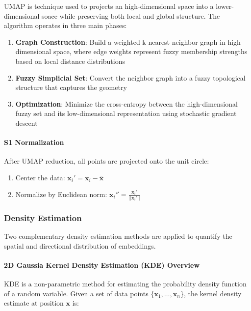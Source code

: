UMAP is technique used to projects an high-dimensional space into a lower-dimensional soace while preserving both local and global structure. The algorithm operates in three main phases:

\begin{enumerate}
    \item \textbf{Graph Construction}: Build a weighted k-nearest neighbor graph in high-dimensional space, where edge weights represent fuzzy membership strengths based on local distance distributions
    \item \textbf{Fuzzy Simplicial Set}: Convert the neighbor graph into a fuzzy topological structure that captures the geometry
    \item \textbf{Optimization}: Minimize the cross-entropy between the high-dimensional fuzzy set and its low-dimensional representation using stochastic gradient descent
\end{enumerate}


\paragraph{S1 Normalization}

After UMAP reduction, all points are projected onto the unit circle:
\begin{enumerate}
    \item Center the data: $\mathbf{x}_i' = \mathbf{x}_i - \bar{\mathbf{x}}$
    \item Normalize by Euclidean norm: $\mathbf{x}_i'' = \frac{\mathbf{x}_i'}{||\mathbf{x}_i'||}$
\end{enumerate}


\subsubsection{Density Estimation}

Two complementary density estimation methods are applied to quantify the spatial and directional distribution of embeddings.

\paragraph{ 2D Gaussia Kernel Density Estimation (KDE) Overview}

KDE is a non-parametric method for estimating the probability density function of a random variable. Given a set of data points $\{\mathbf{x}_1, \ldots, \mathbf{x}_n\}$, the kernel density estimate at position $\mathbf{x}$ is:

